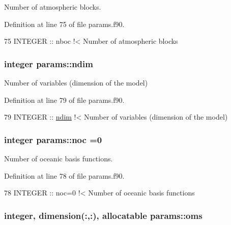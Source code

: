 Number of atmospheric blocks. 



Definition at line 75 of file params.\+f90.


\begin{DoxyCode}
75   \textcolor{keywordtype}{INTEGER} :: nboc\textcolor{comment}{   !< Number of atmospheric blocks}
\end{DoxyCode}
\subsubsection[{\texorpdfstring{ndim}{ndim}}]{\setlength{\rightskip}{0pt plus 5cm}integer params\+::ndim}\hypertarget{namespaceparams_a2323fe1773f086e20c14f266351c482b}{}\label{namespaceparams_a2323fe1773f086e20c14f266351c482b}


Number of variables (dimension of the model) 



Definition at line 79 of file params.\+f90.


\begin{DoxyCode}
79   \textcolor{keywordtype}{INTEGER} :: \hyperlink{namespaceparams_a2323fe1773f086e20c14f266351c482b}{ndim}\textcolor{comment}{   !< Number of variables (dimension of the model)}
\end{DoxyCode}
\subsubsection[{\texorpdfstring{noc}{noc}}]{\setlength{\rightskip}{0pt plus 5cm}integer params\+::noc =0}\hypertarget{namespaceparams_acdb6ef89bcada9ba7b6b6bba575b60f4}{}\label{namespaceparams_acdb6ef89bcada9ba7b6b6bba575b60f4}


Number of oceanic basis functions. 



Definition at line 78 of file params.\+f90.


\begin{DoxyCode}
78   \textcolor{keywordtype}{INTEGER} :: noc=0\textcolor{comment}{  !< Number of oceanic basis functions}
\end{DoxyCode}
\subsubsection[{\texorpdfstring{oms}{oms}}]{\setlength{\rightskip}{0pt plus 5cm}integer, dimension(\+:,\+:), allocatable params\+::oms}\hypertarget{namespaceparams_a5e25e072992d5908eea5308243b7ec63}{}\label{namespaceparams_a5e25e072992d5908eea5308243b7ec63}


